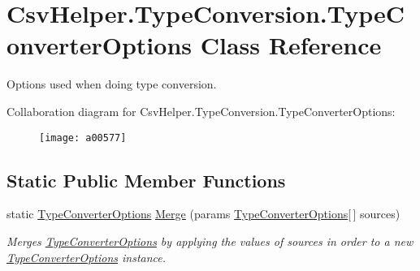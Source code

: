 \hypertarget{a00180}{\section{Csv\-Helper.\-Type\-Conversion.\-Type\-Converter\-Options Class Reference}
\label{a00180}
}


Options used when doing type conversion.  




Collaboration diagram for Csv\-Helper.\-Type\-Conversion.\-Type\-Converter\-Options\-:
\nopagebreak
\begin{figure}[H]
\begin{center}
\leavevmode
\texttt{[image: a00577]}
\end{center}
\end{figure}
\subsection*{Static Public Member Functions}
\begin{DoxyCompactItemize}
\item 
static \hyperlink{a00180}{Type\-Converter\-Options} \hyperlink{a00180_a0532694cffc600fe984e10c7f1375e0a}{Merge} (params \hyperlink{a00180}{Type\-Converter\-Options}\mbox{[}$\,$\mbox{]} sources)
\begin{DoxyCompactList}\small\item\em Merges \hyperlink{a00180}{Type\-Converter\-Options} by applying the values of sources in order to a new \hyperlink{a00180}{Type\-Converter\-Options} instance. \end{DoxyCompactList}\end{DoxyCompactItemize}
